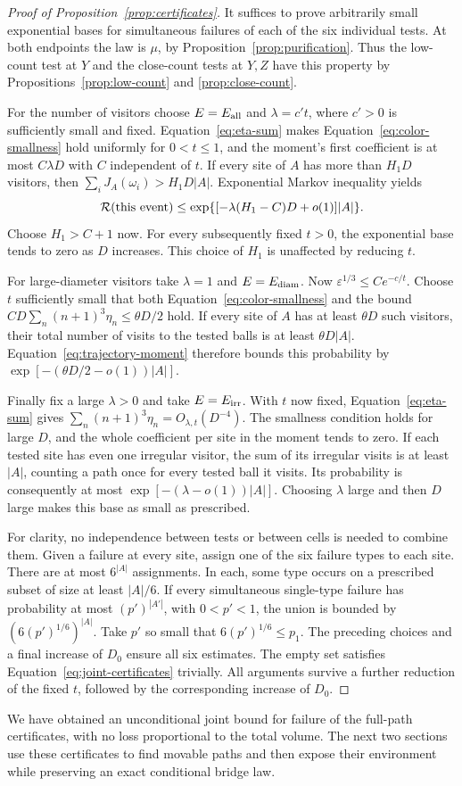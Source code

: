 \begin{proof}[Proof of Proposition~\ref{prop:certificates}]
It suffices to prove arbitrarily small exponential
bases for simultaneous failures of each of the six
individual tests.  At both endpoints the law is
$\mu$, by Proposition~\ref{prop:purification}.
Thus the low-count test at $Y$ and the close-count
tests at $Y,Z$ have this property by
Propositions~\ref{prop:low-count} and \ref{prop:close-count}.

For the number of visitors choose $E=E_{\rm all}$
and $\lambda=c't$, where $c'>0$ is sufficiently
small and fixed.  Equation~\eqref{eq:eta-sum}
makes Equation~\eqref{eq:color-smallness} hold
uniformly for $0<t\le1$, and the moment's first
coefficient is at most $C\lambda D$ with $C$
independent of $t$.  If every site of $A$ has more
than $H_1D$ visitors, then
$\sum_i J_A(\omega_i)>H_1D|A|$.  Exponential
Markov inequality yields
\[
 \mathcal R(\text{this event})
 \le\exp\{[-\lambda(H_1-C)D+o(1)]|A|\}.
\]
Choose $H_1>C+1$ now.  For every subsequently
fixed $t>0$, the exponential base tends to zero
as $D$ increases.  This choice of $H_1$ is
unaffected by reducing $t$.

For large-diameter visitors take $\lambda=1$ and
$E=E_{\rm diam}$.  Now
$\varepsilon^{1/3}\le Ce^{-c/t}$.
Choose $t$ sufficiently small that both
Equation~\eqref{eq:color-smallness} and the bound
$CD\sum_n(n+1)^3\eta_n\le\theta D/2$ hold.
If every site of $A$ has at least $\theta D$
such visitors, their total number of visits to
the tested balls is at least $\theta D|A|$.
Equation~\eqref{eq:trajectory-moment} therefore
bounds this probability by
$\exp[-(\theta D/2-o(1))|A|]$.

Finally fix a large $\lambda>0$ and take
$E=E_{\rm irr}$.  With $t$ now fixed,
Equation~\eqref{eq:eta-sum} gives
$\sum_n(n+1)^3\eta_n=O_{\lambda,t}(D^{-4})$.
The smallness condition holds for large $D$,
and the whole coefficient per site in the
moment tends to zero.  If each tested site has
even one irregular visitor, the sum of its
irregular visits is at least $|A|$, counting
a path once for every tested ball it visits.
Its probability is consequently at most
$\exp[-(\lambda-o(1))|A|]$.
Choosing $\lambda$ large and then $D$ large
makes this base as small as prescribed.

For clarity, no independence between tests or
between cells is needed to combine them.
Given a failure at every site, assign one of
the six failure types to each site.  There
are at most $6^{|A|}$ assignments.  In each,
some type occurs on a prescribed subset of
size at least $|A|/6$.  If every simultaneous
single-type failure has probability at most
$(p')^{|A'|}$, with $0<p'<1$, the union is
bounded by $(6(p')^{1/6})^{|A|}$.
Take $p'$ so small that $6(p')^{1/6}\le p_1$.
The preceding choices and a final increase
of $D_0$ ensure all six estimates.  The empty
set satisfies Equation~\eqref{eq:joint-certificates}
trivially.  All arguments survive a further
reduction of the fixed $t$, followed by the
corresponding increase of $D_0$.
\end{proof}

We have obtained an unconditional joint bound for
failure of the full-path certificates, with no loss
proportional to the total volume.  The next two
sections use these certificates to find movable
paths and then expose their environment while
preserving an exact conditional bridge law.
